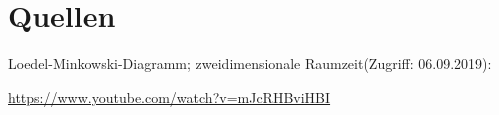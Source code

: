 \documentclass{book}
\begin{document}
 
\tableofcontents


\section{Quellen}
Loedel-Minkowski-Diagramm; zweidimensionale Raumzeit(Zugriff: 06.09.2019):

\url{https://www.youtube.com/watch?v=mJcRHBviHBI} 

 
\end{document}
